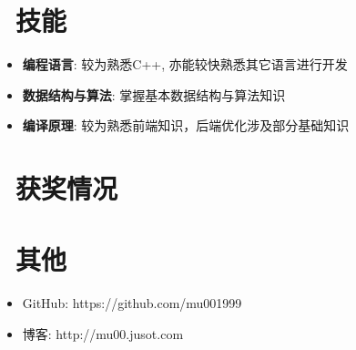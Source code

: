 \documentclass{resume}
\begin{document}

\section{\faCogs\ 技能}
\begin{itemize}[parsep=0.5ex]
  \item \textbf{编程语言}: 较为熟悉C++, 亦能较快熟悉其它语言进行开发
  \item \textbf{数据结构与算法}: 掌握基本数据结构与算法知识
  \item \textbf{编译原理}: 较为熟悉前端知识，后端优化涉及部分基础知识
\end{itemize}

\section{\faHeartO\ 获奖情况}

\section{\faInfo\ 其他}
\begin{itemize}[parsep=0.5ex]
  \item GitHub: https://github.com/mu001999
  \item 博客: http://mu00.jusot.com
\end{itemize}

%
%
\end{document}
